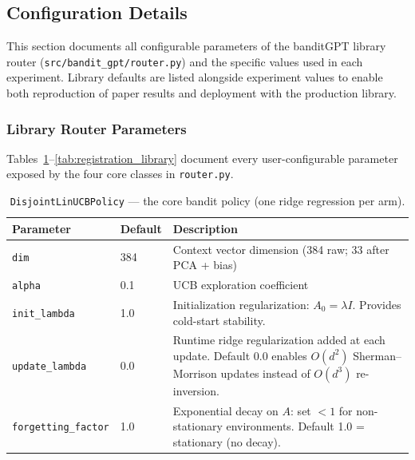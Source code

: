 
\subsection{Configuration Details}
\label{app:config}

This section documents all configurable parameters of the banditGPT library router
(\texttt{src/bandit\_gpt/router.py}) and the specific values used in each experiment.
Library defaults are listed alongside experiment values to enable both reproduction
of paper results and deployment with the production library.


\subsubsection{Library Router Parameters}

Tables~\ref{tab:linucb_library}--\ref{tab:registration_library} document every
user-configurable parameter exposed by the four core classes in \texttt{router.py}.


\begin{table}[h]
\centering
\caption{\texttt{DisjointLinUCBPolicy} --- the core bandit policy (one ridge regression per arm).}
\label{tab:linucb_library}
\small
\begin{tabular}{@{}llp{6.8cm}@{}}
\toprule
\textbf{Parameter} & \textbf{Default} & \textbf{Description} \\
\midrule
\texttt{dim} & 384 & Context vector dimension (384 raw; 33 after PCA + bias) \\
\texttt{alpha} & 0.1 & UCB exploration coefficient \\
\texttt{init\_lambda} & 1.0 & Initialization regularization: $A_0 = \lambda I$. Provides cold-start stability. \\
\texttt{update\_lambda} & 0.0 & Runtime ridge regularization added at each update. Default 0.0 enables $O(d^2)$ Sherman--Morrison updates instead of $O(d^3)$ re-inversion. \\
\texttt{forgetting\_factor} & 1.0 & Exponential decay on $A$: set $<1$ for non-stationary environments. Default 1.0 = stationary (no decay). \\
\bottomrule
\end{tabular}
\end{table}

